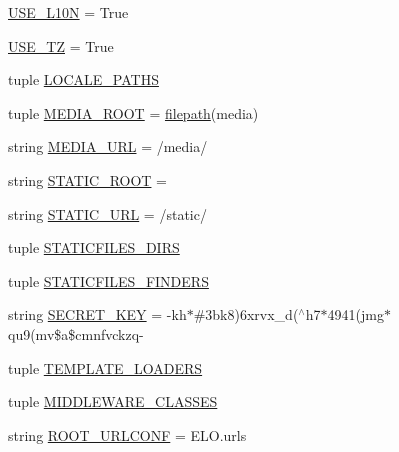 \begin{DoxyCompactItemize}
\item 
\hyperlink{namespaceELO_1_1settings_a863197f2699808509a4c32b38c16eb44}{U\+S\+E\+\_\+\+L10\+N} = True
\item 
\hyperlink{namespaceELO_1_1settings_a8da4c6fc66af84d08bddc0249a473553}{U\+S\+E\+\_\+\+T\+Z} = True
\item 
tuple \hyperlink{namespaceELO_1_1settings_a977570dd2e9cd8142b3d65c4fa37c172}{L\+O\+C\+A\+L\+E\+\_\+\+P\+A\+T\+H\+S}
\item 
tuple \hyperlink{namespaceELO_1_1settings_a7f83b56101acea110bb525439aaa69aa}{M\+E\+D\+I\+A\+\_\+\+R\+O\+O\+T} = \hyperlink{namespaceELO_1_1settings_a7730264ddd478343e0f282f36d4a5ab4}{filepath}(\textquotesingle{}media\textquotesingle{})
\item 
string \hyperlink{namespaceELO_1_1settings_acd3e1c3559f7c87f5aad004b76458ddc}{M\+E\+D\+I\+A\+\_\+\+U\+R\+L} = \textquotesingle{}/media/\textquotesingle{}
\item 
string \hyperlink{namespaceELO_1_1settings_ae5539527ada0171fc602c561493398f4}{S\+T\+A\+T\+I\+C\+\_\+\+R\+O\+O\+T} = \textquotesingle{}\textquotesingle{}
\item 
string \hyperlink{namespaceELO_1_1settings_a408323f388e22737eedf90471a3809a4}{S\+T\+A\+T\+I\+C\+\_\+\+U\+R\+L} = \textquotesingle{}/static/\textquotesingle{}
\item 
tuple \hyperlink{namespaceELO_1_1settings_aa2272e7a822b45c2101e4f5a958e22a6}{S\+T\+A\+T\+I\+C\+F\+I\+L\+E\+S\+\_\+\+D\+I\+R\+S}
\item 
tuple \hyperlink{namespaceELO_1_1settings_a3e4decd51fab7bd5bdbdb12aac13b70a}{S\+T\+A\+T\+I\+C\+F\+I\+L\+E\+S\+\_\+\+F\+I\+N\+D\+E\+R\+S}
\item 
string \hyperlink{namespaceELO_1_1settings_a13a984a190c7599ab7343322ab098d6d}{S\+E\+C\+R\+E\+T\+\_\+\+K\+E\+Y} = \textquotesingle{}-\/kh$\ast$\#3bk8)6xrvx\+\_\+d($^\wedge$h7$\ast$4941(jmg$\ast$qu9(mv\$a\$cmnfvckzq-\/\textquotesingle{}
\item 
tuple \hyperlink{namespaceELO_1_1settings_a9c876284f3865d5a15a73bedccfe3bb7}{T\+E\+M\+P\+L\+A\+T\+E\+\_\+\+L\+O\+A\+D\+E\+R\+S}
\item 
tuple \hyperlink{namespaceELO_1_1settings_a968380d6242dca6cc82acb1d806c703d}{M\+I\+D\+D\+L\+E\+W\+A\+R\+E\+\_\+\+C\+L\+A\+S\+S\+E\+S}
\item 
string \hyperlink{namespaceELO_1_1settings_a9c32eb39b369ab243858f8bd495e698b}{R\+O\+O\+T\+\_\+\+U\+R\+L\+C\+O\+N\+F} = \textquotesingle{}E\+L\+O.\+urls\textquotesingle{}
\item 

\end{DoxyCompactItemize}
